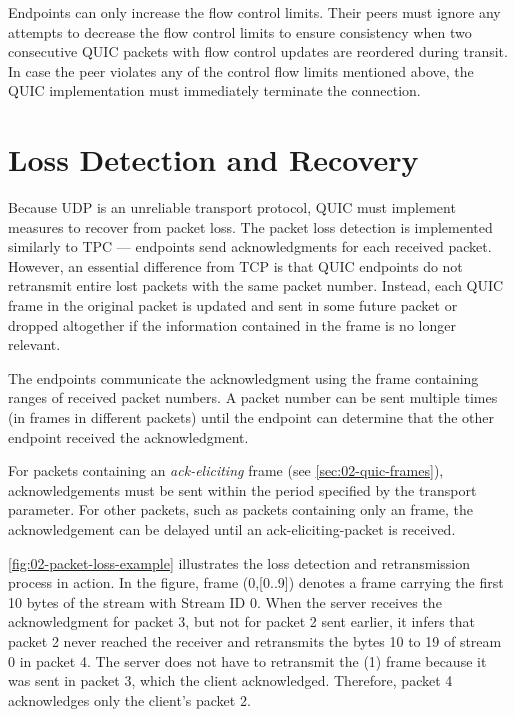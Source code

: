 Endpoints can only increase the flow control limits. Their peers must ignore any attempts to
decrease the flow control limits to ensure consistency when two consecutive QUIC packets with flow
control updates are reordered during transit. In case the peer violates any of the control flow
limits mentioned above, the QUIC implementation must immediately terminate the connection.

\section{Loss Detection and Recovery}\label{sec:02-loss-detection}

Because UDP is an unreliable transport protocol, QUIC must implement measures to recover from packet
loss. The packet loss detection is implemented similarly to TPC --- endpoints send acknowledgments
for each received packet. However, an essential difference from TCP is that QUIC endpoints do not
retransmit entire lost packets with the same packet number. Instead, each QUIC frame in the original
packet is updated and sent in some future packet or dropped altogether if the information contained
in the frame is no longer relevant.

The endpoints communicate the acknowledgment using the \ACK{} frame containing ranges of received
packet numbers. A packet number can be sent multiple times (in \ACK{} frames in different packets)
until the endpoint can determine that the other endpoint received the acknowledgment.

For packets containing an \textit{ack-eliciting} frame (see \autoref{sec:02-quic-frames}),
acknowledgements must be sent within the period specified by the \MaxAckDelay{} transport parameter.
For other packets, such as packets containing only an \ACK{} frame, the acknowledgement can be
delayed until an \gls{ack-eliciting-packet} is received.

\autoref{fig:02-packet-loss-example} illustrates the loss detection and retransmission process in
action. In the figure, frame \STREAM{}(0,[0..9]) denotes a \STREAM{} frame carrying the first 10
bytes of the stream with Stream ID 0. When the server receives the acknowledgment for packet 3, but
not for packet 2 sent earlier, it infers that packet 2 never reached the receiver and retransmits
the bytes 10 to 19 of stream 0 in packet 4. The server does not have to retransmit the \ACK{}(1)
frame because it was sent in packet 3, which the client acknowledged. Therefore, packet 4
acknowledges only the client's packet 2.


